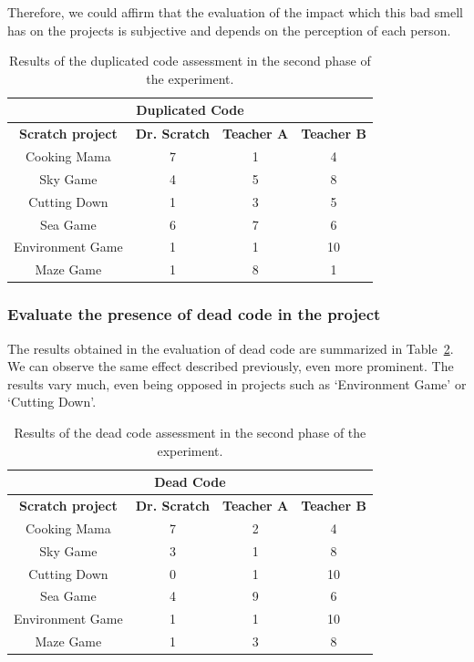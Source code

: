 Therefore, we could affirm that the evaluation of the impact which this bad smell has on the projects is subjective and depends on the perception of each person.


\begin{table}
    \centering
    \begin{tabular}{|c|c|c|c|}
        \hline
        \multicolumn{4}{|c|}{\textbf{Duplicated Code}} \\ \hline
        \textbf{Scratch project} & \textbf{Dr. Scratch} & \textbf{Teacher A} & \textbf{Teacher B} \\ \hline
        Cooking Mama  & 7 & 1 & 4  \\ \hline
        Sky Game & 4 & 5 & 8 \\ \hline
        Cutting Down  & 1 & 3 & 5  \\ \hline
        Sea Game  & 6 & 7 & 6  \\ \hline
        Environment Game  & 1 & 1 & 10  \\ \hline
        Maze Game  & 1 & 8 & 1  \\ \hline
    \end{tabular}
    \caption{Results of the duplicated code assessment in the second phase of the experiment.}
    \label{table:assessment_experiment_dup_code}
\end{table}


\subsubsection{Evaluate the presence of dead code in the project}
\label{subsubsec:dead_code_experiment}

The results obtained in the evaluation of dead code are summarized in Table~\ref{table:assessment_experiment_dead_code}. We can observe the same effect described previously, even more prominent. The results vary much, even being opposed in projects such as `Environment Game' or `Cutting Down'. 

\begin{table}
    \centering
    \begin{tabular}{|c|c|c|c|}
        \hline
        \multicolumn{4}{|c|}{\textbf{Dead Code}} \\ \hline
        \textbf{Scratch project} & \textbf{Dr. Scratch} & \textbf{Teacher A} & \textbf{Teacher B} \\ \hline
        Cooking Mama  & 7 & 2 & 4  \\ \hline
        Sky Game & 3 & 1 & 8 \\ \hline
        Cutting Down  & 0 & 1 & 10  \\ \hline
        Sea Game  & 4 & 9 & 6  \\ \hline
        Environment Game  & 1 & 1 & 10  \\ \hline
        Maze Game  & 1 & 3 & 8  \\ \hline
    \end{tabular}
    \caption{Results of the dead code assessment in the second phase of the experiment.}
    \label{table:assessment_experiment_dead_code}
\end{table}

